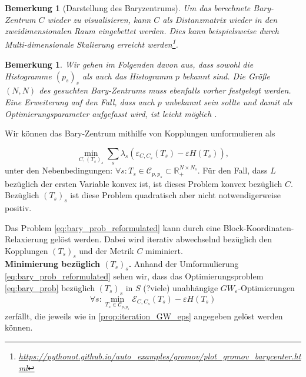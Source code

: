\documentclass[11pt,a4paper]{article}
\newtheorem{remark}[theorem]{Bemerkung}
\numberwithin{equation}{section}
\begin{document}
	\begin{remark}[Darstellung des Baryzentrums]
		Um das berechnete Bary-Zentrum $C$ wieder zu visualisieren, kann $C$ als Distanzmatrix wieder in den zweidimensionalen Raum eingebettet werden. Dies kann beispielsweise durch Multi-dimensionale Skalierung erreicht werden\footnote{\url{https://pythonot.github.io/auto_examples/gromov/plot_gromov_barycenter.html}}.  
		
	\end{remark}
	
	\begin{remark}
		Wir gehen im Folgenden davon aus, dass sowohl die Histogramme $(p_s)_s$ als auch das Histogramm $p$ bekannt sind. Die Größe $(N,N)$ des gesuchten Bary-Zentrums muss ebenfalls vorher festgelegt werden.
		Eine Erweiterung auf den Fall, dass auch $p$ unbekannt sein sollte und damit als Optimierungsparameter aufgefasst wird, ist leicht möglich \cite{gwd_averaging_kernels}.
	\end{remark}
	
	Wir können das Bary-Zentrum mithilfe von Kopplungen umformulieren als
	
	\begin{equation}
	\min_{C,(T_s)_s}{\sum_s{\lambda_s(\varepsilon_{C,C_s}(T_s) - \varepsilon H(T_s))}}, \label{eq:bary_prob_reformulated} 
	\end{equation}
	unter den Nebenbedingungen: $ \forall s: T_s \in \mathcal{C}_{p,p_s} \subset \mathbb{R}_{+}^{N \times N_s}$.
	Für den Fall, dass $L$ bezüglich der ersten Variable konvex ist, ist dieses Problem konvex bezüglich $C$. Bezüglich $(T_s)_s$ ist diese Problem quadratisch aber nicht notwendigerweise positiv.
	
	Das Problem \autoref{eq:bary_prob_reformulated} kann durch eine Block-Koordinaten-Relaxierung gelöst werden. Dabei wird iterativ abwechselnd bezüglich den Kopplungen $(T_s)_s$ und der Metrik $C$ miminiert.\\
	
	\noindent \textbf{Minimierung bezüglich $(T_s)_s$.}
	Anhand der Umformulierung \autoref{eq:bary_prob_reformulated} sehen wir, dass das Optimierungsproblem \autoref{eq:bary_prob} bezüglich $(T_s)_s$ in $S$ (?viele) unabhängige $GW_\varepsilon$-Optimierungen
	\begin{equation}
	\forall s : \min_{T_s \in \mathcal{C}_{p, p_s}}{\mathcal{E}_{C,C_s}(T_s)- \varepsilon H(T_s)}
	\end{equation}
	zerfällt, die jeweils wie in \autoref{prop:iteration_GW_eps} angegeben gelöst werden können.\\
	
\end{document}
